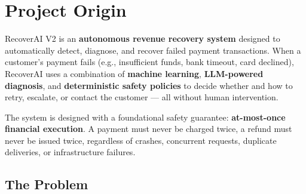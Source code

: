
\section{Project Origin}

\begin{tcolorbox}[summarybox={\iconBulb[1.5] What is RecoverAI V2?}]
\color{textdark}
RecoverAI V2 is an \textbf{autonomous revenue recovery system} designed to automatically detect, diagnose, and recover failed payment transactions. When a customer's payment fails (e.g., insufficient funds, bank timeout, card declined), RecoverAI uses a combination of \textbf{machine learning}, \textbf{LLM-powered diagnosis}, and \textbf{deterministic safety policies} to decide whether and how to retry, escalate, or contact the customer --- all without human intervention.

The system is designed with a foundational safety guarantee: \textbf{at-most-once financial execution}. A payment must never be charged twice, a refund must never be issued twice, regardless of crashes, concurrent requests, duplicate deliveries, or infrastructure failures.
\end{tcolorbox}

\vspace{0.8cm}

\subsection{The Problem}

